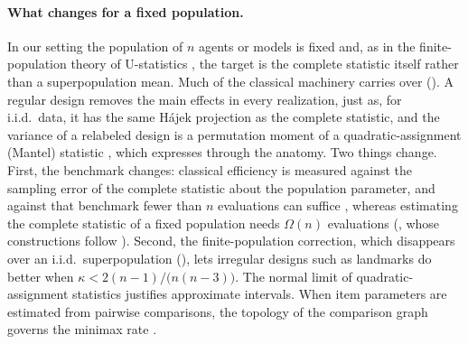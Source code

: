\paragraph{What changes for a fixed population.}
In our setting the population of $n$ agents or models is fixed and, as in the
finite-population theory of U-statistics
\citep{nandi1963properties,bloznelis2001orthogonal}, the target is the
complete statistic itself rather than a superpopulation mean. Much of the
classical machinery carries over (). A regular design
removes the main effects in every realization, just as, for i.i.d.\ data, it has
the same H\'ajek projection as the complete statistic, and the variance of a relabeled design is
a permutation moment of a quadratic-assignment (Mantel) statistic
\citep{daniels1944relation,mantel1967detection,hubert1976quadratic,hubert1987assignment},
which  expresses through the anatomy. Two things
change. First, the benchmark changes: classical efficiency is measured against the
sampling error of the complete statistic about the population parameter, and
against that benchmark fewer than $n$ evaluations can suffice
\citep{kong2021design}, whereas estimating the complete statistic of a fixed
population needs $\Omega(n)$ evaluations (, whose
constructions follow \citealp{barhum2007approximating}). Second, the
finite-population correction, which disappears over an i.i.d.\ superpopulation
(), lets irregular designs such as landmarks do better when
$\kappa<2(n-1)/\bigl(n(n-3)\bigr)$. The normal limit of quadratic-assignment
statistics \citep{barbour1986random} justifies approximate intervals. When item parameters are estimated from pairwise comparisons, the topology of
the comparison graph governs the minimax rate \citep{shah2016estimation}.

